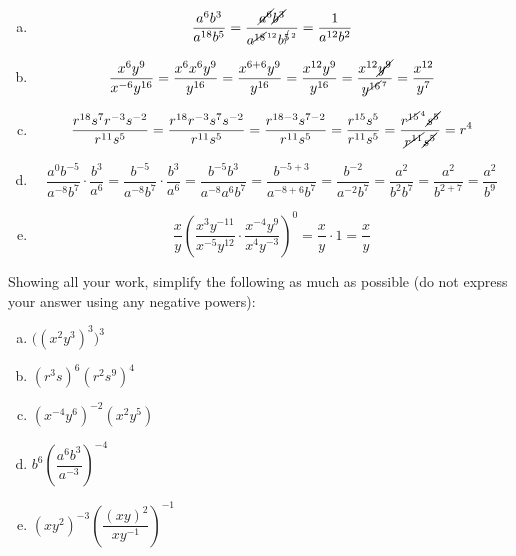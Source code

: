 \documentclass[11pt,letterpaper]{article}
\begin{document}
\sol 
\begin{enumerate}[(a)]
\item 
	\[
	\dfrac{a^6 b^3}{a^{18} b^5}= \dfrac{\cancel{a^6} \cancel{b^3}}{a^{\cancel{18}^{\,12}} b^{\cancel{5}^{\,2}}}= \dfrac{1}{a^{12} b^2}
	\] \pspace

\item 
	\[
	\dfrac{x^6 y^9}{x^{-6} y^{16}}= \dfrac{x^6 x^6 y^9}{y^{16}}= \dfrac{x^{6+6} y^9}{y^{16}}= \dfrac{x^{12} y^9}{y^{16}}= \dfrac{x^{12} \cancel{y^9}}{y^{\cancel{16}^{\,7}}}= \dfrac{x^{12}}{y^7}
	\] \pspace

\item 
	\[
	\dfrac{r^{18} s^7 r^{-3} s^{-2}}{ r^{11} s^5}= \dfrac{r^{18} r^{-3} s^7 s^{-2}}{r^{11} s^5}= \dfrac{r^{18-3} s^{7-2}}{r^{11} s^5}= \dfrac{r^{15} s^5}{r^{11} s^5}= \dfrac{r^{\cancel{15}^{\,4}} \cancel{s^5}}{\cancel{r^{11}} \cancel{s^5}}= r^4
	\] \pspace

\item 
	\[
	\dfrac{a^0 b^{-5}}{a^{-8} b^7} \cdot \dfrac{b^3}{a^6}= \dfrac{b^{-5}}{a^{-8} b^7} \cdot \dfrac{b^3}{a^6}= \dfrac{b^{-5} b^3}{a^{-8} a^6 b^7}= \dfrac{b^{-5+3}}{a^{-8+6} b^7}= \dfrac{b^{-2}}{a^{-2} b^7}= \dfrac{a^2}{b^2 b^7}= \dfrac{a^2}{b^{2+7}}= \dfrac{a^2}{b^9}
	\] \pspace

\item 
	\[
	\dfrac{x}{y} \left( \dfrac{x^3 y^{-11}}{x^{-5} y^{12}} \cdot \dfrac{x^{-4} y^9}{x^4 y^{-3}} \right)^0= \dfrac{x}{y} \cdot 1= \dfrac{x}{y}
	\]
\end{enumerate}



\newpage



 Showing all your work, simplify the following as much as possible (do not express your answer using any negative powers): 
	\begin{enumerate}[(a)]
	\item $\big( (x^2 y^3)^3 \big)^3$
	\item $(r^3s)^6 (r^2s^9)^4$	
	\item $(x^{-4} y^6)^{-2} (x^2 y^5)$
	\item $b^6 \left( \dfrac{a^6 b^3}{a^{-3}} \right)^{-4}$
	\item $(xy^2)^{-3} \left( \dfrac{(xy)^2}{xy^{-1}} \right)^{-1}$
	\end{enumerate} \pspace
\end{document}
